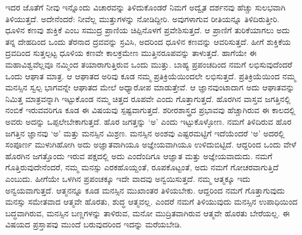 ಇದರ ಜೊತೆಗೆ ನೀವು ಇನ್ನೊಂದು ವಿಚಾರವನ್ನು ತಿಳಿದುಕೊಂಡರೆ ನಿಮಗೆ ಅದ್ವೈತ ದರ್ಶನವು ಹೆಚ್ಚು ಸುಲಭವಾಗಿ ತಿಳಿಯುತ್ತದೆ. ಅದೇನೆಂದರೆ: ನೀವೆಲ್ಲ ಮುತ್ತುಗಳನ್ನು ನೋಡಿದ್ದೀರಿ. ಅವುಗಳಾಗುವ ರೀತಿಯನ್ನೂ ತಿಳಿದಿರುತ್ತೀರಿ. ಧೂಳಿನ ಕಣವು ಶುಕ್ತಿಕೆ ಎಂಬ ಸಮುದ್ರ ಪ್ರಾಣಿಯ ಚಿಪ್ಪಿನೊಳಗೆ ಪ್ರವೇಶಿಸುತ್ತದೆ. ಆ ಪ್ರಾಣಿಗೆ ತುರಿಕೆಯಾಗಲು ಅದು ತನ್ನ ದೇಹದಿಂದ ಒಂದು ತೆರನಾದ ದ್ರವವನ್ನು ಸ್ರವಿಸಿ, ಅದರಿಂದ ಧೂಳಿನ ಕಣವನ್ನು ಆವರಿಸುತ್ತದೆ. ಹೀಗೆ ಶುಕ್ತಿಕೆಯ ದ್ರವದಿಂದ ಸುತ್ತಲ್ಪಟ್ಟ ಧೂಳಿಯ ಕಣವೇ ಕಾಲಕ್ರಮೇಣ ಮುತ್ತಿನರೂಪವನ್ನು ತಾಳುತ್ತದೆ. ಹಾಗೆಯೇ ಈ ಮಹಾವಿಶ್ವವೆಲ್ಲವೂ ನಮ್ಮಿಂದ ತಯಾರಾಗುತ್ತಿರುವ ಒಂದು ಮುತ್ತು. ಬಾಹ್ಯ ಪ್ರಪಂಚದಿಂದ ನಮಗೆ ಲಭಿಸುವುದೆಂದರೆ ಒಂದು ಆಘಾತ ಮಾತ್ರ. ಆ ಆಘಾತದ ಅರಿವು ಕೂಡ ನಮ್ಮ ಪ್ರತಿಕ್ರಿಯೆಯಿಂದಲೇ ಲಭಿಸುತ್ತದೆ. ಪ್ರತಿಕ್ರಿಯೆಯಿಂದ ನಮ್ಮ ಮನಸ್ಸಿನ ಸ್ವಲ್ಪ ಭಾಗವನ್ನೇ ಆಘಾತದ ಮೇಲೆ ಅಧ್ಯಾರೋಪ ಮಾಡುತ್ತೇವೆ. ಆ ಜ್ಞಾನವುಂಟಾದಾಗ ಅದು ಆಘಾತವನ್ನು ನಿಮಿತ್ತ ಮಾತ್ರವನ್ನಾಗಿ ಇಟ್ಟುಕೊಂಡ ನಮ್ಮ ಚಿತ್ತದ ರೂಪವೇ ಎಂದು ಗೊತ್ತಾಗುತ್ತದೆ. ಹೊರಗಿನ ವಾಸ್ತವ ಜಗತ್ತಿನಲ್ಲಿ ನಂಬಿಕೆ ಇರುವವರಿಗೂ ಕೂಡ ಈ ವಿಷಯವು ಸ್ಪಷ್ಟವಾಗುತ್ತದೆ. ಶರೀರಶಾಸ್ತ್ರದ ಪ್ರಭಾವವು ಹೆಚ್ಚಾಗಿರುವ ಈ ಕಾಲದಲ್ಲಿ ಅವರು ಅದನ್ನು ಒಪ್ಪಲೇಬೇಕಾಗುತ್ತದೆ. ಹೊರ ಜಗತ್ತನ್ನು ‘ಅ’ ಎಂದು ಇಟ್ಟುಕೊಳ್ಳೋಣ. ನಮಗೆ ತಿಳಿದಿರುವ ಹೊರ ಜಗತ್ತಿನ ಜ್ಞಾನವು ‘ಅ’ ಮತ್ತು ಮನಸ್ಸಿನ ಮಿಶ್ರಣ. ಮನಸ್ಸಿನ ಅಂಶವು ಎಷ್ಟರಮಟ್ಟಿಗೆ ಇದೆಯೆಂದರೆ ‘ಅ’ ಅದರಲ್ಲಿ ಸಂಪೂರ್ಣ ಮುಳುಗಿಹೋಗಿ ಅದು ಅಜ್ಞಾತವಾಗಿಯೂ ಅಜ್ಞೇಯವಾಗಿಯೂ ಉಳಿದುಬಿಟ್ಟಿದೆ. ಆದ್ದರಿಂದ ಒಂದು ವೇಳೆ ಹೊರಗಿನ ಜಗತ್ತೊಂದು ಇರುವ ಪಕ್ಷದಲ್ಲಿ ಅದು ಎಂದೆಂದಿಗೂ ಆಜ್ಞಾತ ಮತ್ತು ಅಜ್ಞೇಯವಾದುದು. ನಮಗೆ ಗೊತ್ತಿರುವುದೇನೆಂದರೆ, ನಮ್ಮ ಮನಸ್ಸು ಎರಕಹೊಯ್ದಂತೆ, ರೂಪಕೊಟ್ಟಂತೆ, ಅದು ನಮಗೆ ಗೋಚರವಾಗುತ್ತಿದೆ ಎಂಬುದು. ಹೀಗೆಯೇ ಒಳಗಿನ ಪ್ರಪಂಚಕ್ಕೂ ಇದೇ ವಾದವು ಅನ್ವಯಿಸುತ್ತದೆ. ನಮ್ಮ ಆತ್ಮಕ್ಕೂ ಇದು ಅನ್ವಯವಾಗುತ್ತದೆ. ಆತ್ಮನನ್ನೂ ಕೂಡ ಮನಸ್ಸಿನ ಮುಖಾಂತರ ತಿಳಿಯಬೇಕು. ಆದ್ದರಿಂದ ನಮಗೆ ಗೊತ್ತಾಗುವುದು ಮನಸ್ಸು ಸಮೇತವಾದ ಆತ್ಮವೇ ಹೊರತು, ಶುದ್ಧ ಆತ್ಮವಲ್ಲ. ಎಂದರೆ ನಮಗೆ ತಿಳಿಯುವುದು ಮನಸ್ಸಿನ ಉಪಾಧಿಯಿಂದ ಬದ್ಧವಾಗಿರುವ, ಮನಸ್ಸಿನ ಬಣ್ಣಗಳನ್ನು ತಾಳಿರುವ, ಮನೋ ಮುದ್ರಿತವಾಗಿರುವ ಆತ್ಮವೇ ಹೊರತು ಬೇರೆಯಲ್ಲ. ಈ ವಿಷಯದ ಪ್ರಸ್ತಾಪವು ಮುಂದೆ ಬರುವುದರಿಂದ ಇದನ್ನು ಮರೆಯಬೇಡಿ. 

